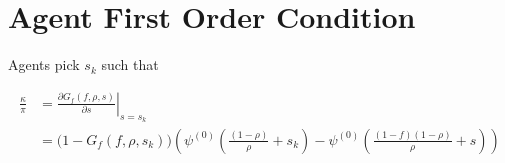 \documentclass[american, abstract=on]{scrartcl}
\theoremstyle{plain}
\begin{document}
\newpage

\section{Agent First Order Condition}

Agents pick $s_k$ such that

\begin{equation}
    \begin{split}
        \frac{\kappa}{\pi} &= \left.\frac{\partial G_f(f, \rho, s)}{\partial s}\right\vert_{s = s_k} \\ 
        &= \big(1 - G_f(f, \rho, s_k)\big) \left(\psi^{(0)}\left( \frac{(1-\rho)}{\rho} + s_k \right) - \psi^{(0)}\left( \frac{(1-f)(1- \rho)}{\rho} + s \right) \right)
    \end{split}
\end{equation}
\end{document}
